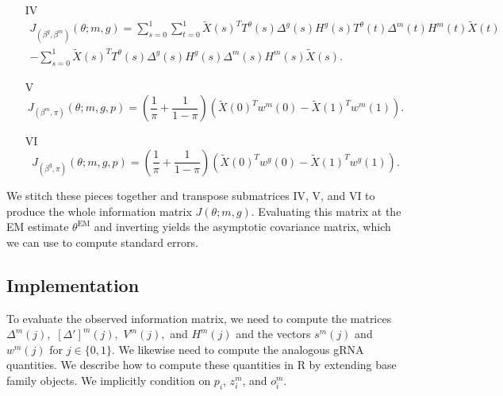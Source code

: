 \documentclass[11pt]{article}
\begin{document}
\begin{appendices}
\begin{refsection}
\begin{itemize}
\begin{multline*}
\end{multline*}
\item[IV] \begin{multline*}
J_{(\beta^g, \beta^m)}(\theta; m, g) = \sum_{s=0}^1 \sum_{t=0}^1 \tilde{X}(s)^T  T^\theta(s) {\Delta}^g(s) {H}^g(s) T^\theta(t){\Delta}^m(t) {H}^m(t) \tilde{X}(t) \\ - \sum_{s=0}^1 \tilde{X}(s)^T T^\theta(s) {\Delta}^g(s) {H}^g(s) {\Delta}^m(s) {H}^m(s) \tilde{X}(s).
\end{multline*}
\item[V] $$ J_{(\beta^m, \pi)}(\theta; m, g, p) = \left( \frac{1}{\pi} + \frac{1}{1 - \pi} \right) \left( \tilde{X}(0)^T w^m(0) - \tilde{X}(1)^T w^m(1)\right).  $$
\item[VI] $$ J_{(\beta^g, \pi)}(\theta; m, g, p) = \left(\frac{1}{\pi} + \frac{1}{1 - \pi} \right) \left( \tilde{X}(0)^T w^g(0) - \tilde{X}(1)^T w^g(1)\right).$$
\end{itemize}
We stitch these pieces together and transpose submatrices IV, V, and VI to produce the whole information matrix $J(\theta; m, g)$. Evaluating this matrix at the EM estimate $\theta^\textrm{EM}$ and inverting yields the asymptotic covariance matrix, which we can use to compute standard errors.

\subsection{Implementation}
To evaluate the observed information matrix, we need to compute the matrices $\Delta^m(j),$ $[\Delta']^m(j),$ $V^m(j),$ and $H^m(j)$ and the vectors $s^m(j)$ and $w^m(j)$ for $j \in \{0,1\}$. We likewise need to compute the analogous gRNA quantities. We describe how to compute these quantities in R by extending base family objects. We implicitly condition on $p_i$, $z^m_i$, and $o^m_i$.


\end{refsection}
\end{appendices}
\end{document}
